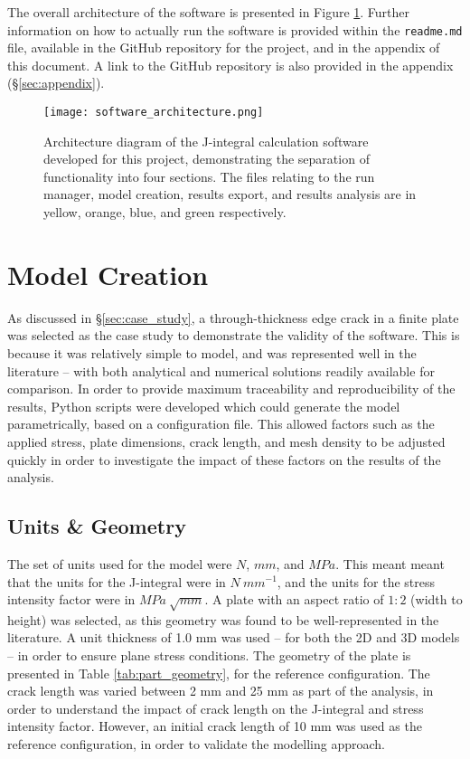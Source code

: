 The overall architecture of the software is presented in Figure \ref{fig:software_architecture}. Further information on how to actually run the software is provided within the \texttt{readme.md} file, available in the GitHub repository for the project, and in the appendix of this document. A link to the GitHub repository is also provided in the appendix (\S\ref{sec:appendix}).

\begin{figure}[H]
	\centering
	\texttt{[image: software\_architecture.png]}
	\caption{Architecture diagram of the J-integral calculation software developed for this project, demonstrating the separation of functionality into four sections. The files relating to the run manager, model creation, results export, and results analysis are in yellow, orange, blue, and green respectively.}
	\label{fig:software_architecture}
\end{figure}

\newpage
\section{Model Creation}\label{sec:fea_modelling}

As discussed in \S\ref{sec:case_study}, a through-thickness edge crack in a finite plate was selected as the case study to demonstrate the validity of the software. This is because it was relatively simple to model, and was represented well in the literature -- with both analytical and numerical solutions readily available for comparison. In order to provide maximum traceability and reproducibility of the results, Python scripts were developed which could generate the model parametrically, based on a configuration file. This allowed factors such as the applied stress, plate dimensions, crack length, and mesh density to be adjusted quickly in order to investigate the impact of these factors on the results of the analysis.

\subsection{Units \& Geometry}

The set of units used for the model were $N$, $mm$, and $MPa$. This meant meant that the units for the J-integral were in $N\ mm^{-1}$, and the units for the stress intensity factor were in $MPa\ \sqrt{mm}$. A plate with an aspect ratio of $1:2$ (width to height) was selected, as this geometry was found to be well-represented in the literature. A unit thickness of 1.0 mm was used -- for both the 2D and 3D models -- in order to ensure plane stress conditions. The geometry of the plate is presented in Table \ref{tab:part_geometry}, for the reference configuration. The crack length was varied between 2 mm and 25 mm as part of the analysis, in order to understand the impact of crack length on the J-integral and stress intensity factor. However, an initial crack length of 10 mm was used as the reference configuration, in order to validate the modelling approach.

